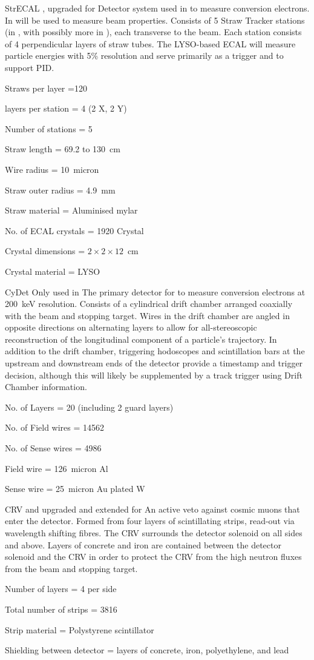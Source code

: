 {StrECAL}
{}
{\phaseI, upgraded for \phaseII}
{Detector system used in \phaseII to measure conversion electrons.
  In \phaseI will be used to measure beam properties.
  Consists of 5 Straw Tracker stations (in \phaseI, with possibly more in \phaseII), each transverse to the beam.
  Each station consists of 4 perpendicular layers of straw tubes.
  The LYSO-based ECAL will measure particle energies with 5\% resolution and serve primarily as a trigger and to support PID.}
{\item Straws per layer =120
 \item layers per station  = 4 (2 X, 2 Y)
 \item Number of stations = 5
 \item Straw length = 69.2 to 130~cm
 \item Wire radius = 10~micron
 \item Straw outer radius = 4.9~mm 
 \item Straw material = Aluminised mylar
 \item No. of ECAL crystals = 1920 Crystal
 \item Crystal dimensions = $2\times2\times12$~cm
 \item Crystal material = LYSO }

{CyDet}
{}
{Only used in \phaseI}
{The primary detector for \phaseI to measure conversion electrons at 200~keV resolution.
  Consists of a cylindrical drift chamber arranged coaxially with the beam and stopping target.
  Wires in the drift chamber are angled in opposite directions on alternating layers to allow for all-stereoscopic reconstruction of the longitudinal component of a particle's trajectory.
  In addition to the drift chamber, triggering hodoscopes and scintillation bars at the upstream and downstream ends of the detector provide a timestamp and trigger decision, although this will likely be supplemented by a track trigger using Drift Chamber information.}
{\item No. of Layers = 20 (including 2 guard layers)
 \item No. of Field wires = 14562
 \item No. of Sense wires = 4986
 \item Field wire = 126~micron Al
 \item Sense wire = 25~micron Au plated W }

{CRV}
{}
{\phaseI and upgraded and extended for \phaseII }
{An active veto against cosmic muons that enter the detector.  Formed from four layers of scintillating strips, read-out via wavelength shifting fibres.  The CRV surrounds the detector solenoid on all sides and above.  Layers of concrete and iron are contained between the detector solenoid and the CRV in order to protect the CRV from the high neutron fluxes from the beam and stopping target. }
{\item Number of layers = 4 per side
 \item Total number of strips = 3816  
 \item Strip material = Polystyrene scintillator 
 \item Shielding between detector = layers of concrete, iron, polyethylene, and lead }

